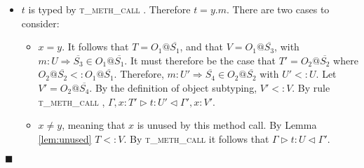 \documentclass[preprint]{sigplanconf}
\makeatletter
\newcommand{\lemref}[1]{Lemma \ref{#1}}
\newcommand{\tfunc}{\textsc{t\_fun\_call} }
\newcommand{\tmethc}{\textsc{t\_meth\_call} }
\newcommand{\twiden}{\textsc{t\_widen} }
\newcommand{\subfn}{\textsc{sub\_fn}}
\newcommand{\remapapp}[3]{\ensuremath{\mathbf{remap}(#1, #2 \gg #3)}}
\newcommand{\typerule}[4]{#1 \triangleright #2 : #3 \triangleleft #4}
\newcommand{\ot}[2]{#1@\overline{#2}}
\newcommand{\funt}[3]{(\overline{#1 \gg #2}) \rightarrow #3}
\newcommand{\qed}{$\blacksquare$}
\newenvironment{proof}{\vspace{1ex}\noindent{\bf Proof}\hspace{0.5em}}
  {\hfill\qed\vspace{1ex}}
\makeatother
\begin{document}
\begin{proof}
\begin{itemize}
\begin{itemize}
	\item $x = y$.
	Therefore $T = \funt{T_i}{T_i'}{U}$, with
	$\Gamma(z_i) = T_i$ and $\Gamma'(z_i) = T_i'$ for each $i$.
	Additionally, $T = V$ by \tfunc.

	$T'$ must therefore be of form $\funt{W_i}{W_i'}{W}$ where
	$T_i <: W_i$ and $W_i' <: T_i'$ and $W <: U$
	by \subfn. Let $V' = T'$. Let $U' = W$.
	Let $\Gamma''$ be a context such that

		\begin{itemize}
		\item $dom(\Gamma'') = dom(\Gamma')$
		\item $\Gamma''(z_i) = \remapapp{\Gamma(z_i)}{W_i}{W_i'}$ for each $z_i$.
		\item $\forall a \notin \overline{z_i} . \Gamma''(a) = \Gamma'(a)$
		\end{itemize}

	It follows by rule \tfunc that $\typerule{\Gamma, x : T'}{t}{U'}{\Gamma'', x : T'}$.
	By \lemref{lem:remap}, $\Gamma''(z_i) <: W_i' <: \Gamma'(z_i)$ for each
	$z_i$. Therefore by repeated application of \twiden for each $z_i$,
	$\typerule{\Gamma, x : T'}{t}{U'}{\Gamma', x : V'}$,
	with $U' <: U$ and $V <: V$.

	\item $x \in \overline{z_i}$. 
	By \tfunc it follows that $\Gamma(y) = \funt{U_i}{V_i}{U}$
	and that $T = U_i$ and $V = V_i$ for some $i$.
	Let $V' = \remapapp{T'}{T}{V}$ and $U' = U$. It follows that
	$\typerule{\Gamma, x : T'}{t}{U}{\Gamma, x : V'}$,
	with $U' <: U$ and
	$V' <: V'$ by \lemref{lem:remap}.
\end{itemize}

\item $t$ is typed by \tmethc. Therefore $t = y.m$.
There are two cases to consider:

\begin{itemize}
	\item $x = y$. It follows that $T = \ot{O_1}{S_1}$, and that
	$V = \ot{O_1}{S_3}$, with $m : U \Rightarrow \overline{S_3} \in \ot{O_1}{S_1}$.
	It must therefore be the case that $T' = \ot{O_2}{S_2}$ where
	$\ot{O_2}{S_2} <: \ot{O_1}{S_1}$. Therefore,
	$m : U' \Rightarrow \overline{S_4} \in \ot{O_2}{S_2}$ with
	$U' <: U$. Let $V' = \ot{O_2}{S_4}$. By the definition of object subtyping,
	$V' <: V$.
	By rule \tmethc, $\typerule{\Gamma, x : T'}{t}{U'}{\Gamma', x : V'}$.

	\item $x \neq y$, meaning that $x$ is unused by this method call.
	By \lemref{lem:unused} $T <: V$. By \tmethc it follows that
	$\typerule{\Gamma}{t}{U}{\Gamma'}$.


\end{itemize}
\end{itemize}
\end{proof}
\end{document}
